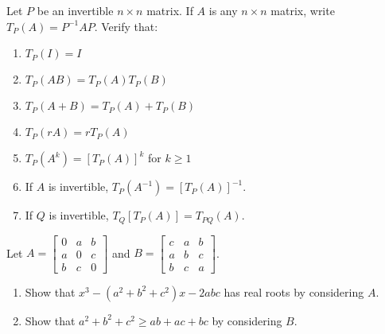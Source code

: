 \documentclass{ximera}
\begin{document}
\begin{problem}\label{prob:5_5_12}
Let $P$ be an invertible $n \times n$ matrix. If $A$ is any $n \times n$ matrix, write $T_{P}(A) = P^{-1}AP$. Verify that:

\begin{enumerate}
\item\label{prob:5_5_12a} $T_{P}(I) = I$
\item\label{prob:5_5_12b} $T_{P}(AB) = T_{P}(A)T_{P}(B)$
\item\label{prob:5_5_12c} $T_{P}(A + B) = T_{P}(A) + T_{P}(B)$
\item\label{prob:5_5_12d} $T_{P}(rA) = rT_{P}(A)$
\item\label{prob:5_5_12e} $T_{P}(A^{k}) = [T_{P}(A)]^{k}$ for $k \geq 1$
\item\label{prob:5_5_12f} If $A$ is invertible, $T_{P}(A^{-1}) = [T_{P}(A)]^{-1}$.
\item\label{prob:5_5_12g} If $Q$ is invertible, $T_{Q}[T_{P}(A)] = T_{PQ}(A)$.
\end{enumerate}

\end{problem}



\begin{problem}
Let $A = \begin{bmatrix}
0 & a & b \\
a & 0 & c \\
b & c & 0	
\end{bmatrix}$ and $B =
\begin{bmatrix}
c & a & b \\
a & b & c \\
b & c & a
\end{bmatrix}$.

\begin{enumerate}
\item Show that $x^{3} - (a^{2} + b^{2} + c^{2})x - 2abc$ has real roots by considering $A$.

\item Show that $a^{2} + b^{2} + c^{2} \geq ab + ac + bc$ by considering $B$.
\end{enumerate}
\end{problem}
\end{document}
